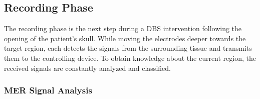 \documentclass[review]{vgtc}                 %
\begin{document}
\subsection{Recording Phase}\label{sec:overview:recording}
The recording phase is the next step during a DBS intervention following the opening of the patient's skull. While moving the electrodes deeper towards the target region, each detects the signals from the surrounding tissue and transmits them to the controlling device. To obtain knowledge about the current region, the received signals are constantly analyzed and classified.

\subsubsection{MER Signal Analysis}\label{sec:overview:recording:signalanalysis}
%
\end{document}
